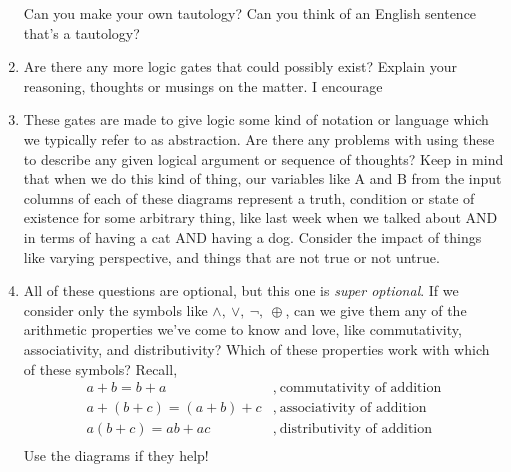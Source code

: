\begin{enumerate}
        \vspace{10mm}
        Can you make your own tautology? Can you think of an English sentence that's a tautology?
    \item Are there any more logic gates that could possibly exist? Explain your reasoning, thoughts or musings on the matter. I encourage
    \item These gates are made to give logic some kind of notation or language which we typically refer to as abstraction. Are there any problems
        with using these to describe any given logical argument or sequence of thoughts? Keep in mind that when we do this kind of thing, our variables
        like A and B from the input columns of each of these diagrams represent a truth, condition or state of existence for some arbitrary thing, like
        last week when we talked about AND in terms of having a cat AND having a dog. Consider the impact of things like varying perspective, and things
        that are not true or not untrue.
        \newpage
    \item All of these questions are optional, but this one is \textit{super optional}. If we consider only the symbols like $\land,\ \lor,\ \neg,\ \oplus$,
        can we give them any of the arithmetic properties we've come to know and love, like commutativity, associativity, and distributivity? Which of
        these properties work with which of these symbols? Recall,
        \begin{align*}
            a+b=b+a&,\ \text{commutativity of addition}\\
            a+(b+c)=(a+b)+c&,\ \text{associativity of addition}\\
            a(b+c)=ab+ac&,\ \text{distributivity of addition}\\
        \end{align*}
        Use the diagrams if they help!
\end{enumerate}

